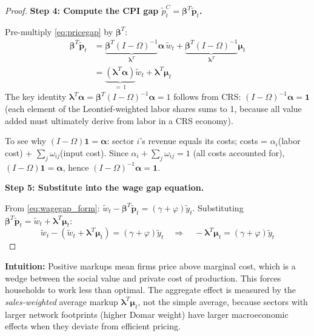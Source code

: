 \documentclass[12pt]{article}
\begin{document}
\begin{proof}
\textbf{Step 4: Compute the CPI gap $\tilde{p}_t^C = \bm{\beta}^T\tilde{\bm{p}}_t$.}

Pre-multiply \eqref{eq:pricegap} by $\bm{\beta}^T$:
\begin{align}
    \bm{\beta}^T\tilde{\bm{p}}_t &= \underbrace{\bm{\beta}^T(I-\Omega)^{-1}}_{\bm{\lambda}^T}\bm{\alpha}\,\tilde{w}_t + \underbrace{\bm{\beta}^T(I-\Omega)^{-1}}_{\bm{\lambda}^T}\bm{\mu}_t \nonumber\\
    &= \underbrace{(\bm{\lambda}^T\bm{\alpha})}_{=\,1}\tilde{w}_t + \bm{\lambda}^T\bm{\mu}_t
\end{align}
The key identity $\bm{\lambda}^T\bm{\alpha} = \bm{\beta}^T(I-\Omega)^{-1}\bm{\alpha} = 1$ follows from CRS: $(I-\Omega)^{-1}\bm{\alpha} = \mathbf{1}$ (each element of the Leontief-weighted labor shares sums to 1, because all value added must ultimately derive from labor in a CRS economy).

To see why $(I-\Omega)\mathbf{1} = \bm{\alpha}$: sector $i$'s revenue equals its costs; costs = $\alpha_i$(labor cost) + $\sum_j \omega_{ij}$(input cost). Since $\alpha_i + \sum_j \omega_{ij} = 1$ (all costs accounted for), $(I-\Omega)\mathbf{1} = \bm{\alpha}$, hence $(I-\Omega)^{-1}\bm{\alpha} = \mathbf{1}$.

\textbf{Step 5: Substitute into the wage gap equation.}

From \eqref{eq:wagegap_form}: $\tilde{w}_t - \bm{\beta}^T\tilde{\bm{p}}_t = (\gamma+\varphi)\tilde{y}_t$. Substituting $\bm{\beta}^T\tilde{\bm{p}}_t = \tilde{w}_t + \bm{\lambda}^T\bm{\mu}_t$:
\begin{equation}
    \tilde{w}_t - (\tilde{w}_t + \bm{\lambda}^T\bm{\mu}_t) = (\gamma+\varphi)\tilde{y}_t
    \quad \Rightarrow \quad
    -\bm{\lambda}^T\bm{\mu}_t = (\gamma+\varphi)\tilde{y}_t
\end{equation}
\end{proof}

\begin{insight}
\textbf{Intuition:} Positive markups mean firms price above marginal cost, which is a wedge between the social value and private cost of production. This forces households to work less than optimal. The aggregate effect is measured by the \textit{sales-weighted} average markup $\bm{\lambda}^T\bm{\mu}_t$, not the simple average, because sectors with larger network footprints (higher Domar weight) have larger macroeconomic effects when they deviate from efficient pricing.
\end{insight}

\end{document}
